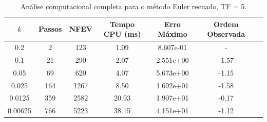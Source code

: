 \begin{table}[H]
    \centering
    \begin{tabular}{ccccccc}
        \hline
        $k$ & Passos & NFEV & Tempo CPU (ms) & Erro Máximo & Ordem Observada \\
        \hline
        0.2 & 2 & 123 & 1.09  & 8.607e-01 & - \\
        0.1 & 21 & 290 & 2.07  & 2.551e+00 & -1.57 \\
        0.05 & 69 & 620 & 4.07  & 5.673e+00 & -1.15 \\
        0.025 & 164 & 1267 & 8.50  & 1.692e+01 & -1.58 \\
        0.0125 & 359 & 2582 & 20.93  & 1.907e+01 & -0.17 \\
        0.00625 & 766 & 5223 & 38.15  & 4.151e+01 & -1.12 \\
        \hline
    \end{tabular}
    \caption{Análise computacional completa para o método Euler recuado, TF = 5.}
    \label{tab:erros_euler_recuado,_tf_=_5}
\end{table}

